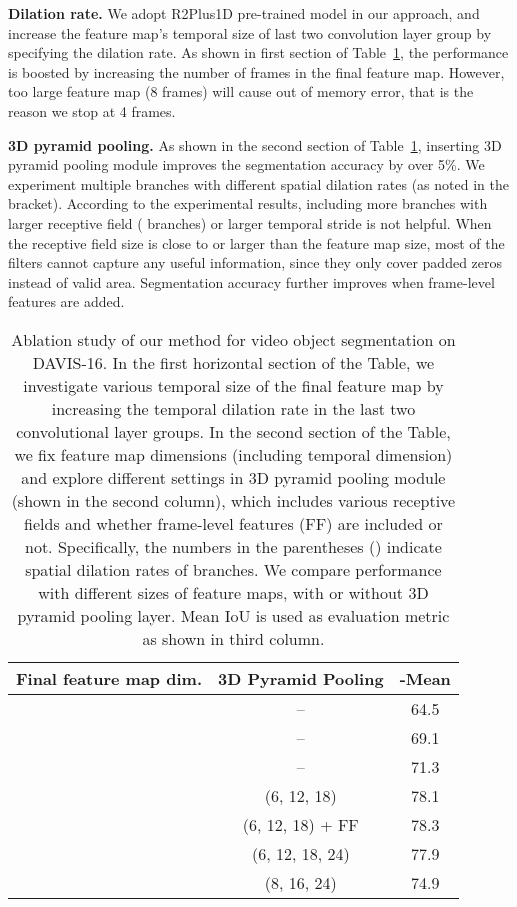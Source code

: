 \documentclass{bmvc2k}
\begin{document}
\textbf{Dilation rate.} We adopt R2Plus1D pre-trained model in our approach, and increase the feature map's temporal size of last two convolution layer group by specifying the dilation rate. 
As shown in first section of Table~\ref{tab:ablation}, the performance is boosted by increasing the number of frames in the final feature map. However, too large feature map (8 frames) will cause out of memory error, that is the reason we stop at 4 frames.



\textbf{3D pyramid pooling.} As shown in the second section of Table~\ref{tab:ablation}, inserting 3D pyramid pooling module improves the segmentation accuracy by over 5\%. We experiment multiple branches with different spatial dilation rates (as noted in the bracket). According to the experimental results, including more branches with larger receptive field ( branches) or larger temporal stride is not helpful. When the receptive field size is close to or larger than the feature map size, most of the filters cannot capture any useful information, since they only cover padded zeros instead of valid area. Segmentation accuracy further improves when frame-level features are added.



\begin{table}[!htbp]
\centering
\begin{tabular}{c|c|c}
\hline
Final feature map dim.  & 3D Pyramid Pooling    & -Mean \\
\hline
     & --                    & 64.5 \\
     & --                    & 69.1 \\
     & --                    & 71.3 \\
\hline
     & (6, 12, 18)           & 78.1 \\
     & (6, 12, 18) + FF      & 78.3 \\
     & (6, 12, 18, 24)       & 77.9 \\
     & (8, 16, 24)           & 74.9 \\
\hline
\end{tabular}
\caption{Ablation study of our method for video object segmentation on DAVIS-16. 
In the first horizontal section of the Table, we investigate various temporal size of the final feature map by increasing the temporal dilation rate in the last two convolutional layer groups. In the second section of the Table, we fix feature map dimensions (including temporal dimension) and explore different settings in 3D pyramid pooling module (shown in the second column), which includes various receptive fields and whether frame-level features (FF) are included or not. Specifically, the numbers in the parentheses () indicate spatial dilation rates of branches. We compare  performance with different sizes of feature maps,  
with or without 3D pyramid pooling layer. 
Mean IoU is used as evaluation metric as shown in third column. 
}
\label{tab:ablation}
\end{table}
\end{document}
